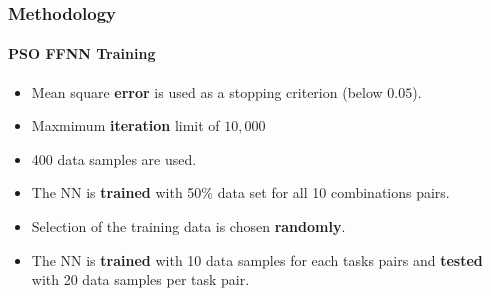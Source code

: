 \frame
{
\frametitle{Methodology}
\framesubtitle{PSO FFNN Training}
\begin{itemize}
	\item Mean square \textbf{error} is used as a stopping criterion (below $0.05$).
	\item Maxmimum \textbf{iteration} limit of $10,000$
	\item 400 data samples are used.
	\item The NN is \textbf{trained}  with 50\% data set for all 10 combinations pairs.
	\item Selection of the training data is chosen \textbf{randomly}.
	\item The NN is \textbf{trained} with 10 data samples for each tasks pairs and \textbf{tested} with 20 data samples per task pair.
\end{itemize}
}

